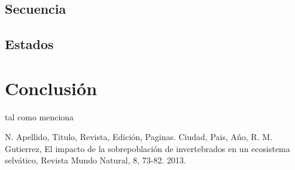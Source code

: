\documentclass[letter,12pt]{report}
\begin{document}
\section{Secuencia}
\section{Estados}

\chapter{Conclusión}
tal como menciona \cite{001}


%
\begin{thebibliography}{}
 N. Apellido, Titulo, Revista, Edición, Paginas. Ciudad, Pais, Año,
%
 R. M. Gutierrez, El impacto de la sobrepoblación de invertebrados en un ecosistema selvático, Revista Mundo Natural, 8, 73-82. 2013.
%
%
\end{thebibliography}  
%
%
%
%
%
%
%
%
%
%
%
%
%
%
%
%
%
%
%
\end{document}
